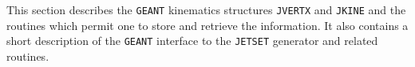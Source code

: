         
        

This section describes the {\tt GEANT} kinematics structures {\tt JVERTX} and
{\tt JKINE} and the routines which permit one to store and retrieve the 
information. It also contains a short description of the {\tt GEANT} 
interface to the {\tt JETSET} generator and related routines.
